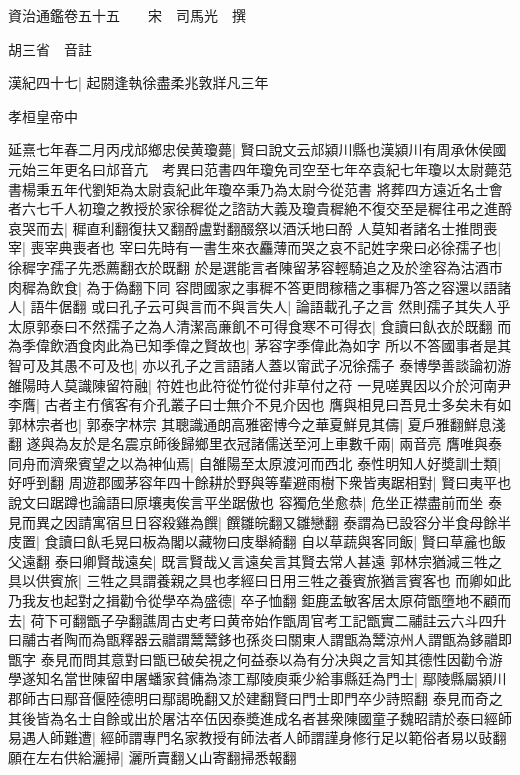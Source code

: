 資治通鑑卷五十五　　宋　司馬光　撰

胡三省　音註

漢紀四十七|{
	起閼逢執徐盡柔兆敦牂凡三年}


孝桓皇帝中

延熹七年春二月丙戌邟鄉忠侯黄瓊薨|{
	賢曰說文云邟潁川縣也漢潁川有周承休侯國元始三年更名曰邟音亢　考異曰范書四年瓊免司空至七年卒袁紀七年瓊以太尉薨范書楊秉五年代劉矩為太尉袁紀此年瓊卒秉乃為太尉今從范書}
將葬四方遠近名士會者六七千人初瓊之教授於家徐穉從之諮訪大義及瓊貴穉絶不復交至是穉往弔之進酹哀哭而去|{
	穉直利翻復扶又翻酹盧對翻醊祭以酒沃地曰酹}
人莫知者諸名士推問喪宰|{
	喪宰典喪者也}
宰曰先時有一書生來衣麤薄而哭之哀不記姓字衆曰必徐孺子也|{
	徐穉字孺子先悉薦翻衣於既翻}
於是選能言者陳留茅容輕騎追之及於塗容為沽酒市肉穉為飲食|{
	為于偽翻下同}
容問國家之事穉不答更問稼穡之事穉乃答之容還以語諸人|{
	語牛倨翻}
或曰孔子云可與言而不與言失人|{
	論語載孔子之言}
然則孺子其失人乎太原郭泰曰不然孺子之為人清潔高亷飢不可得食寒不可得衣|{
	食讀曰飤衣於既翻}
而為季偉飲酒食肉此為已知季偉之賢故也|{
	茅容字季偉此為如字}
所以不答國事者是其智可及其愚不可及也|{
	亦以孔子之言語諸人蓋以甯武子况徐孺子}
泰博學善談論初游雒陽時人莫識陳留符融|{
	符姓也此符從竹從付非草付之苻}
一見嗟異因以介於河南尹李膺|{
	古者主冇儐客有介孔叢子曰士無介不見介因也}
膺與相見曰吾見士多矣未有如郭林宗者也|{
	郭泰字林宗}
其聰識通朗高雅密博今之華夏鮮見其儔|{
	夏戶雅翻鮮息淺翻}
遂與為友於是名震京師後歸鄉里衣冠諸儒送至河上車數千兩|{
	兩音亮}
膺唯與泰同舟而濟衆賓望之以為神仙焉|{
	自雒陽至太原渡河而西北}
泰性明知人好奬訓士類|{
	好呼到翻}
周遊郡國茅容年四十餘耕於野與等輩避雨樹下衆皆夷踞相對|{
	賢曰夷平也說文曰踞蹲也論語曰原壤夷俟言平坐踞傲也}
容獨危坐愈恭|{
	危坐正襟盡前而坐}
泰見而異之因請寓宿旦日容殺雞為饌|{
	饌雛皖翻又雛戀翻}
泰謂為已設容分半食母餘半庋置|{
	食讀曰飤毛晃曰板為閣以藏物曰庋舉綺翻}
自以草蔬與客同飯|{
	賢曰草麄也飯父遠翻}
泰曰卿賢哉遠矣|{
	既言賢哉乂言遠矣言其賢去常人甚遠}
郭林宗猶減三牲之具以供賓旅|{
	三牲之具謂養親之具也孝經曰日用三牲之養賓旅猶言賓客也}
而卿如此乃我友也起對之揖勸令從學卒為盛德|{
	卒子恤翻}
鉅鹿孟敏客居太原荷甑墮地不顧而去|{
	荷下可翻甑子孕翻譙周古史考曰黄帝始作甑周官考工記甑實二鬴註云六斗四升曰鬴古者陶而為甑釋器云䰝謂鬵鬵鉹也孫炎曰關東人謂甑為鬵涼州人謂甑為鉹䰝即甑字}
泰見而問其意對曰甑已破矣視之何益泰以為有分决與之言知其德性因勸令游學遂知名當世陳留申屠蟠家貧傭為漆工鄢陵庾乘少給事縣廷為門士|{
	鄢陵縣屬潁川郡師古曰鄢音偃陸德明曰鄢謁晩翻又於建翻賢曰門士即門卒少詩照翻}
泰見而奇之其後皆為名士自餘或出於屠沽卒伍因泰奬進成名者甚衆陳國童子魏昭請於泰曰經師易遇人師難遭|{
	經師謂專門名家教授有師法者人師謂謹身修行足以範俗者易以䜴翻}
願在左右供給灑掃|{
	灑所賣翻乂山寄翻掃悉報翻}
